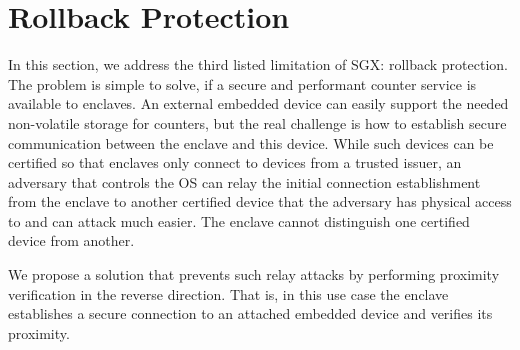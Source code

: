 \section{\name Rollback Protection}
\label{sec:rollback}



In this section, we address the third listed limitation of SGX: rollback protection. The problem is simple to solve, if a secure and performant counter service is available to enclaves. An external embedded device can easily support the needed non-volatile storage for counters, but the real challenge is how to establish secure communication between the enclave and this device. While such devices can be certified so that enclaves only connect to devices from a trusted issuer, an adversary that controls the OS can relay the initial connection establishment from the enclave to another certified device that the adversary has physical access to and can attack much easier. The enclave cannot distinguish one certified device from another.

We propose a solution that prevents such relay attacks by performing proximity verification in the reverse direction. That is, in this use case the enclave establishes a secure connection to an attached embedded device and verifies its proximity.  


 
